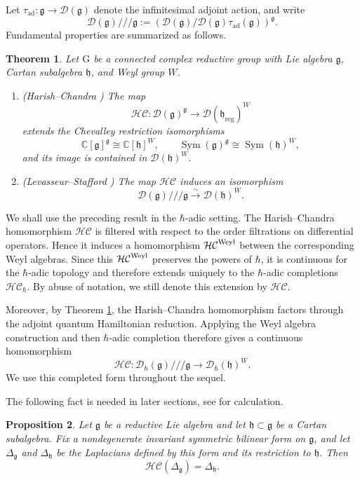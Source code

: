 \documentclass[11pt,reqno]{amsart}
\newtheorem{theorem}{Theorem}[section]
\newtheorem{proposition}[theorem]{Proposition}
\theoremstyle{definition}
\newcommand{\bbC}{\mathbb{C}}
\newcommand{\rmG}{\mathrm{G}}
\newcommand{\mD}{\mathcal{D}}
\newcommand{\fkg}{\mathfrak{g}}
\newcommand{\fg}{\mathfrak{g}}
\newcommand{\Sym}{\operatorname{Sym}}
\newcommand{\fkh}{\mathfrak{h}}
\newcommand{\hc}{\mathcal{HC}}
\newcommand{\reg}{\mathrm{reg}}
\begin{document}
Let \(\tau_{\mathrm{ad}}:\fkg\to\mD(\fkg)\) denote the infinitesimal
adjoint action, and write
\[
\mD(\fkg)///\fkg
:=
\left(
\mD(\fkg)\big/\mD(\fkg)\tau_{\mathrm{ad}}(\fkg)
\right)^{\fkg}.
\]
Fundamental properties are summarized as follows.
\begin{theorem}\label{thm: hc regular}
Let \(\rmG\) be a connected complex reductive group with Lie algebra
\(\fkg\), Cartan subalgebra \(\fkh\), and Weyl group \(W\).
\begin{enumerate}
\item \textup{(Harish--Chandra \cite{HC1964Inv})} The map
\[
\hc:\mD(\fkg)^\fkg \to
\mD(\fkh_{\reg})^W
\]
extends the Chevalley restriction isomorphisms
\[
\bbC[\fkg]^\fkg \cong\bbC[\fkh]^W,
\qquad
\Sym(\fkg)^\fkg \cong \Sym(\fkh)^W,
\]
and its image is contained in \(\mD(\fkh)^W\).

\item \textup{(Levasseur--Stafford \cite{LevSta1995Inv,LevSta1996Ker})} 
The map \(\hc\) induces an 
isomorphism
\[
\mD(\fkg)///\fkg\xrightarrow{\sim}\mD(\fkh)^W.
\]
\end{enumerate}
\end{theorem}



{We shall use the preceding result in the \(\hbar\)-adic setting.
The Harish--Chandra homomorphism \(\hc\)
is filtered with respect to the order filtrations on 
differential operators.
Hence it induces a homomorphism \(\hc^{\rm Weyl}\) between the corresponding Weyl algebras.
Since this \(\hc^{\rm Weyl}\) preserves
the powers of \(\hbar\), it is continuous for the \(\hbar\)-adic topology and therefore extends uniquely to the \(\hbar\)-adic completions \(\hc_\hbar\).
By abuse of notation,
we still denote this extension by \(\hc\).}

{Moreover, by Theorem \ref{thm: hc regular}, the Harish--Chandra homomorphism factors through the adjoint quantum
Hamiltonian reduction.  Applying the Weyl algebra construction and then
\(\hbar\)-adic completion therefore gives a continuous homomorphism
\[
\hc:
\mD_\hbar(\fkg)///\fkg
\longrightarrow
\mD_\hbar(\fkh)^W .
\]
We use this completed form throughout the sequel.}


The following fact is needed in later sections, see \cite[Lemma 4.6]{Eti2009Lec} for calculation.
\begin{proposition}\label{prop: hc laplacian}
Let \(\fg\) be a reductive Lie algebra and let
\(\fkh\subset\fg\) be a Cartan subalgebra. Fix a nondegenerate
invariant symmetric bilinear form on \(\fg\), and let
\(\Delta_{\fg}\) and \(\Delta_{\fkh}\) be the Laplacians defined by
this form and its restriction to \(\fkh\). Then
\[
\hc(\Delta_{\fg})=\Delta_{\fkh}.
\]
\end{proposition}
\end{document}
